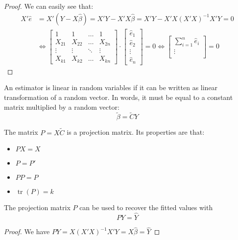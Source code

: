 \begin{proof}
We can easily see that:\begin{align*}
X'\hat e & = X'(Y - X\hat\beta) = X'Y - X'X\hat\beta = X'Y - X'X(X'X)^{-1}X'Y = 0 \\ & \Leftrightarrow
\begin{bmatrix}
    1 & 1 & \dots & 1 \\
    X_{21} & X_{22} & \dots & X_{2n} \\
    \vdots & \vdots & \ddots & \vdots \\
   X_{k1} & X_{k2} & \dots & X_{kn}
\end{bmatrix}
\cdot 
\begin{bmatrix}
    \hat e_{1}\\
    \hat e_{2}\\
    \vdots\\
    \hat e_{n}
\end{bmatrix} = 0 \Leftrightarrow \begin{bmatrix}
    \sum_{i=1}^{n}\hat e_{i}\\
    \vdots\\
\end{bmatrix} = 0
\end{align*}
\end{proof}

\begin{definition}
An estimator is linear in random variables if it can be written as linear transformation of a random vector. In words, it must be equal to a constant matrix multiplied by a random vector: $$\tilde{\beta} = \tilde{C}Y$$
\end{definition}

\begin{definition}
The matrix $P = X\tilde{C}$ is a projection matrix. Its properties are that:\begin{itemize}
\item $PX = X$
\item $P=P'$
\item $PP = P$
\item $\operatorname{tr}(P) = k$
\end{itemize} 
\end{definition}

\begin{proposition}
The projection matrix $P$ can be used to recover the fitted values with $$PY = \hat Y$$
\end{proposition}
\begin{proof}
We have $PY = X(X'X)^{-1}X'Y = X\hat\beta = \hat Y$
\end{proof}

